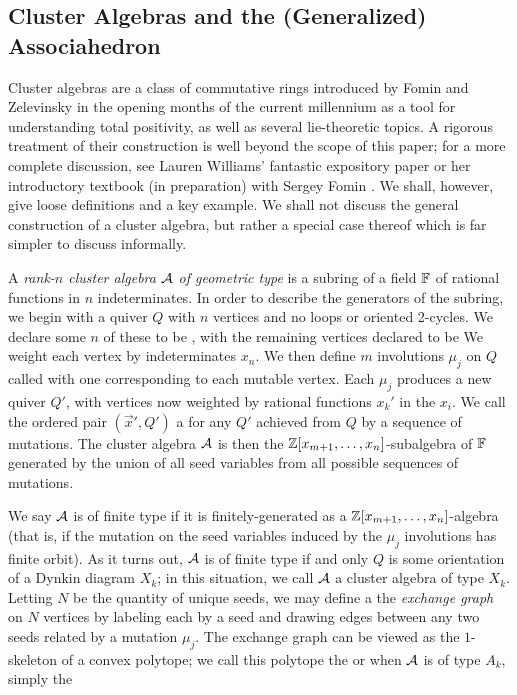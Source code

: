 \documentclass[12pt,letter]{article}
\begin{document}
\subsection{Cluster Algebras and the (Generalized) Associahedron}
Cluster algebras are a class of commutative rings introduced by Fomin and Zelevinsky \cite{cl1,cl2,cl3,cl4} in the opening months of the current millennium as a tool for understanding total positivity, as well as several lie-theoretic topics. A rigorous treatment of their construction is well beyond the scope of this paper; for a more complete discussion, see Lauren Williams' fantastic expository paper \cite{wicl} or her introductory textbook (in preparation) with Sergey Fomin \cite{WiFo13,WiFo45}. We shall, however, give loose definitions and a key example. We shall not discuss the general construction of a cluster algebra, but rather a special case thereof which is far simpler to discuss informally.

A \textit{rank-$n$ cluster algebra ${\mathcal A}$ of geometric type} is a subring of a field ${\mathbb F}$ of rational functions in $n$ indeterminates. In order to describe the generators of the subring, we begin with a quiver $Q$ with $n$ vertices and no loops or oriented 2-cycles. We declare some $n$ of these to be , with the remaining vertices declared to be  We weight each vertex by indeterminates $x_n$. We then define $m$ involutions $\mu_j$ on $Q$ called  with one corresponding to each mutable vertex. Each $\mu_j$ produces a new quiver $Q'$, with vertices now weighted by rational functions $x_k'$ in the $x_i$. We call the ordered pair $(\vec{x}',Q')$ a  for any $Q'$ achieved from $Q$ by a sequence of mutations. The cluster algebra ${\mathcal A}$ is then the ${\mathbb Z}[x_{m+1},\hdots,x_n]$-subalgebra of ${\mathbb F}$ generated by the union of all seed variables from all possible sequences of mutations. 

We say ${\mathcal A}$ is of finite type if it is finitely-generated as a ${\mathbb Z}[x_{m+1},\hdots,x_n]$-algebra (that is, if the mutation on the seed variables induced by the $\mu_j$ involutions has finite orbit). As it turns out, ${\mathcal A}$ is of finite type if and only $Q$ is some orientation of a Dynkin diagram $X_k$; in this situation, we call ${\mathcal A}$ a cluster algebra of type $X_k$. Letting $N$ be the quantity of unique seeds, we may define a the \textit{exchange graph} on $N$ vertices by labeling each by a seed and drawing edges between any two seeds related by a mutation $\mu_j$. The exchange graph can be viewed as the $1$-skeleton of a convex polytope; we call this polytope the  or when ${\mathcal A}$ is of type $A_k$, simply the  
\end{document}
